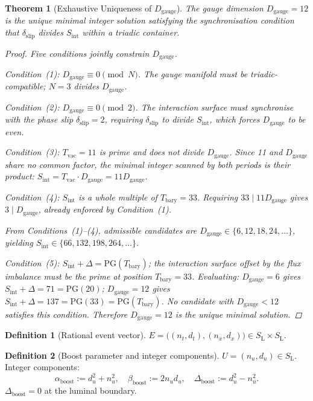 \documentclass[11pt, letterpaper]{article}
\newcommand{\SL}{S_{\mathrm{L}}}
\newcommand{\Tbary}{T_{\mathrm{bary}}}
\newcommand{\Dg}{D_{\mathrm{gauge}}}
\newcommand{\Sint}{S_{\mathrm{int}}}
\newcommand{\PG}{\mathrm{PG}}
\theoremstyle{definition}
\newtheorem{definition}{Definition}[section]
\theoremstyle{plain}
\newtheorem{theorem}{Theorem}[section]
\begin{document}
\begin{theorem}[Exhaustive Uniqueness of $\Dg$]\label{thm:Dg-unique}
The gauge dimension $\Dg=12$ is the unique minimal integer solution
satisfying the synchronisation condition that $\delta_{\mathrm{slip}}$
divides $\Sint$ within a triadic container.
\begin{proof}
Five conditions jointly constrain $\Dg$.

Condition~(1): $\Dg\equiv 0\pmod{N}$.  The gauge manifold must be
triadic-compatible; $N=3$ divides $\Dg$.

Condition~(2): $\Dg\equiv 0\pmod{2}$.  The interaction surface must
synchronise with the phase slip $\delta_{\mathrm{slip}}=2$, requiring
$\delta_{\mathrm{slip}}$ to divide $\Sint$, which forces
$\Dg$ to be even.

Condition~(3): $T_{\mathrm{vac}}=11$ is prime and does not divide $\Dg$.
Since 11 and $\Dg$ share no common factor, the minimal integer scanned
by both periods is their product: $\Sint=T_{\mathrm{vac}}\cdot\Dg=11\Dg$.

Condition~(4): $\Sint$ is a whole multiple of $\Tbary=33$.  Requiring
$33\mid 11\Dg$ gives $3\mid\Dg$, already enforced by Condition~(1).

From Conditions~(1)--(4), admissible candidates are
$\Dg\in\{6,12,18,24,\ldots\}$, yielding
$\Sint\in\{66,132,198,264,\ldots\}$.

Condition~(5): $\Sint+\Delta=\PG(T_{\mathrm{bary}})$; the interaction
surface offset by the flux imbalance must be the prime at position
$T_{\mathrm{bary}}=33$.  Evaluating: $\Dg=6$ gives
$\Sint+\Delta=71=\PG(20)$; $\Dg=12$ gives
$\Sint+\Delta=137=\PG(33)=\PG(T_{\mathrm{bary}})$.  No candidate with
$\Dg<12$ satisfies this condition.  Therefore $\Dg=12$ is the unique minimal
solution.
\end{proof}
\end{theorem}

\begin{definition}[Rational event vector]\label{def:event}
$E=\bigl((n_t,d_t),(n_x,d_x)\bigr)\in\SL\times\SL$.
\end{definition}

\begin{definition}[Boost parameter and integer components]\label{def:boost}
$U=(n_u,d_u)\in\SL$.  Integer components:
\[
\alpha_{\mathrm{boost}}:=d_u^2+n_u^2, \quad
\beta_{\mathrm{boost}}:=2n_u d_u, \quad
\Delta_{\mathrm{boost}}:=d_u^2-n_u^2.
\]
$\Delta_{\mathrm{boost}}=0$ at the luminal boundary.
\end{definition}
\end{document}
